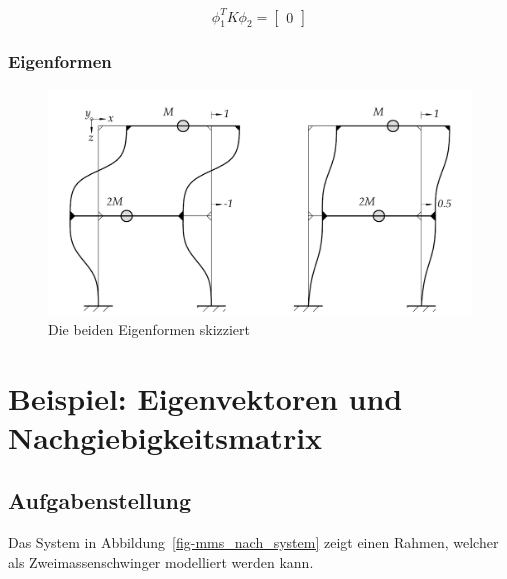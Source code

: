 \documentclass[
  letterpaper,
  DIV=11]{scrreprt}
\begin{document}
\begin{equation}\phi_{1}^{T} K \phi_{2} = \left[\begin{matrix}0\end{matrix}\right]\end{equation}

\hypertarget{eigenformen}{%
\subsection{Eigenformen}\label{eigenformen}}

\begin{figure}[H]

{\centering \includegraphics{index_files/mediabag/bilder/aufgabe_mms_steif_eigenvektoren.pdf}

}

\caption{\label{fig-mms_steif_eigenformen}Die beiden Eigenformen
skizziert}

\end{figure}

\hypertarget{beispiel-eigenvektoren-und-nachgiebigkeitsmatrix}{%
\chapter{Beispiel: Eigenvektoren und
Nachgiebigkeitsmatrix}\label{beispiel-eigenvektoren-und-nachgiebigkeitsmatrix}}

\hypertarget{aufgabenstellung-11}{%
\section{Aufgabenstellung}\label{aufgabenstellung-11}}

Das System in Abbildung~\ref{fig-mms_nach_system} zeigt einen Rahmen,
welcher als Zweimassenschwinger modelliert werden kann.
\end{document}
